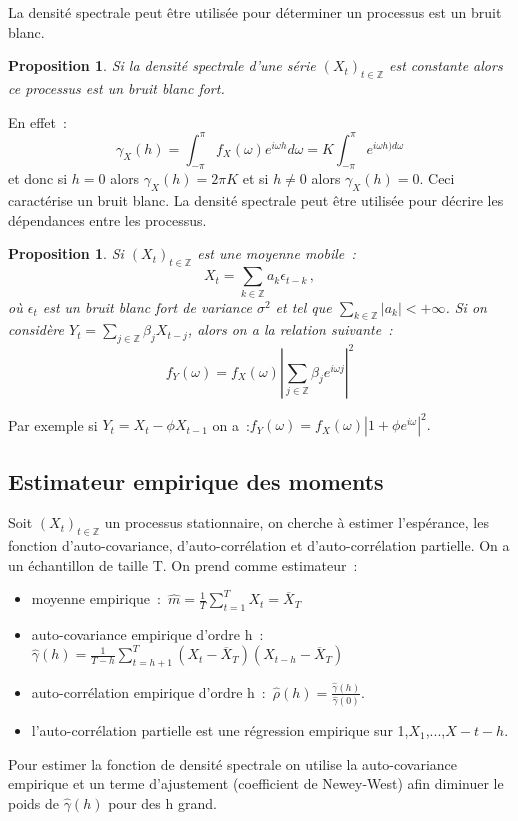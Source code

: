 \documentclass[11pt]{scrartcl} %
\newtheorem{pro}[theorem]{Proposition}
\newcommand{\Xt}{\left(X_t\right)_{t\in\mathbb{Z}}}
\begin{document}
La densité spectrale peut être utilisée pour déterminer un processus est un bruit blanc.
\begin{pro}
Si la densité spectrale d'une série $\Xt$ est constante alors ce processus est un bruit blanc fort.
\end{pro}
En effet~:
$$
\gamma_X(h)=\int_{-\pi}^{\pi}f_X(\omega)e^{i\omega h}d\omega = K\int_{-\pi}^{\pi}e^{i\omega h)d\omega}
$$
et donc si $h=0$ alors $\gamma_X(h)=2\pi K$ et si $h\not=0$ alors $\gamma_X(h)=0$. Ceci caractérise un bruit blanc. La densité spectrale peut être utilisée pour décrire les dépendances entre les processus.
\begin{pro}
Si $\Xt$ est une moyenne mobile~:
$$
X_t = \sum_{k\in\mathbb{Z}}a_k\epsilon_{t-k}\,,
$$
où $\epsilon_t$ est un bruit blanc fort de variance $\sigma^2$ et tel que $\sum_{k\in\mathbb{Z}}|a_k| <+\infty$. Si on considère $Y_t = \sum_{j\in\mathbb{Z}}\beta_jX_{t-j}$, alors on a la relation suivante~:
$$
f_Y(\omega)=f_X(\omega)\left|\sum_{j\in\mathbb{Z}}\beta_je^{i\omega j}\right|^2
$$
\end{pro}
Par exemple si $Y_t=X_t-\phi X_{t-1}$ on a~:$f_Y(\omega)=f_X(\omega)\left|1+\phi e^{i\omega}\right|^2.$
\subsection{Estimateur empirique des moments}
Soit $(X_t)_{t\in\mathbb{Z}}$ un processus stationnaire, on cherche à estimer l'espérance, les fonction d'auto-covariance, d'auto-corrélation et d'auto-corrélation partielle. On a un échantillon de taille T. On prend comme estimateur~:
\begin{itemize}
\item moyenne empirique~:~$\hat{m}=\frac{1}{T}\sum_{t=1}^TX_t=\overline{X}_T$\\
\item auto-covariance empirique d'ordre h~:~$\hat{\gamma}(h)=\frac{1}{T-h}\sum_{t=h+1}^T(X_t-\overline{X}_T)(X_{t-h}-\overline{X}_T)$\\
\item auto-corrélation empirique d'ordre h~:~$\hat{\rho}(h)=\frac{\hat{\gamma}(h)}{\hat{\gamma}(0)}$.\\
\item l'auto-corrélation partielle est une régression empirique sur 1,$X_1$,...,$X-{t-h}$.
\end{itemize}
Pour estimer la fonction de densité spectrale on utilise la auto-covariance empirique et un terme d'ajustement (coefficient de Newey-West) afin diminuer le poids de $\hat{\gamma}(h)$ pour des h grand.
\end{document}
